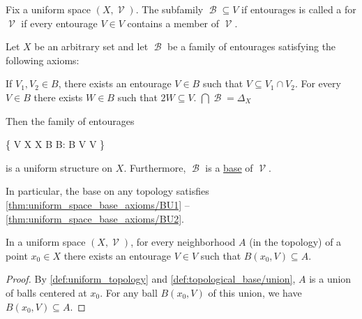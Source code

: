 \begin{definition}\label{def:uniform_space_base}
  Fix a uniform space \( (X, \mscrV) \). The subfamily \( \mscrB \subseteq V \) if entourages is called a  for \( \mscrV \) if every entourage \( V \in V \) contains a member of \( \mscrV \).
\end{definition}

\begin{definition}\label{thm:uniform_space_base_axioms}
  Let \( X \) be an arbitrary set and let \( \mscrB \) be a family of entourages satisfying the following axioms:
  \begin{thmenum}
     If \( V_1, V_2 \in B \), there exists an entourage \( V \in B \) such that \( V \subseteq V_1 \cap V_2 \).
     For every \( V \in B \) there exists \( W \in B \) such that \( 2W \subseteq V \).
     \( \bigcap \mscrB = \Delta_X \)
  \end{thmenum}

  Then the family of entourages
  \begin{balign}\label{thm:uniform_space_base_axioms/uniformity}
    \mscrV \coloneqq \left\{ V \subseteq X \times X \colon \exists B \in B: B \in V  V  \right\}
  \end{balign}
  is a uniform structure on \( X \). Furthermore, \( \mscrB \) is a \hyperref[def:uniform_space_base]{base} of \( \mscrV \).

  In particular, the base on any topology satisfies \ref{thm:uniform_space_base_axioms/BU1} -- \ref{thm:uniform_space_base_axioms/BU2}.
\end{definition}

\begin{lemma}\label{thm:uniform_space_neighborhood_contains_ball}
  In a uniform space \( (X, \mscrV) \), for every neighborhood \( A \) (in the topology) of a point \( x_0 \in X \) there exists an entourage \( V \in V \) such that \( B(x_0, V) \subseteq A \).
\end{lemma}
\begin{proof}
  By \cref{def:uniform_topology} and \cref{def:topological_base/union}, \( A \) is a union of balls centered at \( x_0 \). For any ball \( B(x_0, V) \) of this union, we have \( B(x_0, V) \subseteq A \).
\end{proof}

